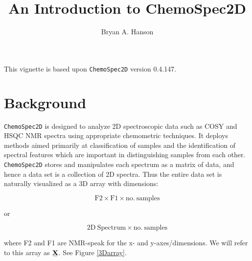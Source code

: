 \documentclass[10pt,twocolumn,twoside,]{pinp}
\title{An Introduction to ChemoSpec2D}
\author[a]{Bryan A. Hanson}
\affil[a]{Dept. of Chemistry \& Biochemistry, DePauw University;
\url{hanson@depauw.edu}}
\begin{document}
\verticaladjustment{-2pt}

\maketitle
\thispagestyle{firststyle}



\newcommand\ubar[1]{\stackunder[1.2pt]{$#1$}{\rule{1.2ex}{.075ex}}}

This vignette is based upon \texttt{ChemoSpec2D} version 0.4.147.

\hypertarget{background}{%
\section{Background}\label{background}}

\texttt{ChemoSpec2D} is designed to analyze 2D spectroscopic data such
as COSY and HSQC NMR spectra using appropriate chemometric techniques.
It deploys methods aimed primarily at classification of samples and the
identification of spectral features which are important in
distinguishing samples from each other. \texttt{ChemoSpec2D} stores and
manipulates each spectrum as a matrix of data, and hence a data set is a
collection of 2D spectra. Thus the entire data set is naturally
visualized as a 3D array with dimensions:

\[
\mathrm{F2} \times \mathrm{F1} \times \mathrm{no. \ samples}
\]

or

\[
\mathrm{2D \ Spectrum} \times \mathrm{no. \ samples}
\]

where F2 and F1 are NMR-speak for the x- and y-axes/dimensions. We will
refer to this array as
\(\stackunder[1.2pt]{$\mathbf{X}$}{\rule{1.2ex}{.075ex}}\). See Figure
\ref{3Darray}.
\end{document}
